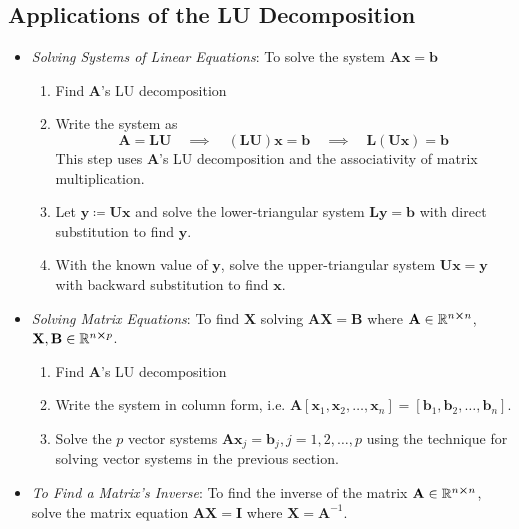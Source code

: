 \documentclass[11pt, a4paper]{article}
\newcommand{\R}{\mathbb{R}} %
\newcommand{\mat}[1]{\mathbf{#1}} %
\begin{document}
\subsection{Applications of the LU Decomposition}
\begin{itemize}
	\item \textit{Solving Systems of Linear Equations}: To solve the system $ \mat{A} \bm{x} = \bm{b} $
	\begin{enumerate}
		\item Find $ \mat{A} $'s LU decomposition
		
		\item Write the system as
		\begin{equation*}
			\mat{A} = \mat{L} \mat{U} \quad \implies \quad (\mat{L} \mat{U}) \bm{x} = \bm{b} \quad \implies \quad \mat{L} (\mat{U} \bm{x}) = \bm{b}
		\end{equation*}
		This step uses $ \mat{A} $'s LU decomposition and the associativity of matrix multiplication.
	
	
		\item Let $ \bm{y} \coloneqq \mat{U} \bm{x} $ and solve the lower-triangular system $ \mat{L} \bm{y} = \bm{b} $ with direct substitution to find $ \bm{y} $.
		
		\item With the known value of $ \bm{y} $, solve the upper-triangular system $ \mat{U} \bm{x} = \bm{y} $ with backward substitution to find $ \bm{x} $.
	\end{enumerate}
	
	\item \textit{Solving Matrix Equations}: To find $ \mat{X} $ solving $ \mat{A} \mathbf{X} = \mathbf{B} $ where $ \mat{A} \in \R^{n \cross n} $, $ \mathbf{X}, \mathbf{B} \in \R^{n \cross p} $.
	\begin{enumerate}
		\item Find $ \mat{A} $'s LU decomposition
		
        \item Write the system in column form, i.e. $ \mat{A} [\bm{x}_1, \bm{x}_{2}, \dots, \bm{x}_n] = [\bm{b}_1, \bm{b}_{2}, \dots, \bm{b}_n]  $.
		
        \item Solve the $ p $ vector systems $ \mat{A} \bm{x}_{j} = \bm{b}_{j}, j = 1, 2, \ldots, p $ using the technique for solving vector systems in the previous section.
		
	\end{enumerate}
	
	\item \textit{To Find a Matrix's Inverse}: To find the inverse of the matrix $ \mat{A} \in \R^{n \cross n}$, solve the matrix equation $ \mat{A} \mat{X} = \mat{I} $ where  $ \mathbf{X} = \mat{A}^{-1} $.
	

\end{itemize}
\end{document}
